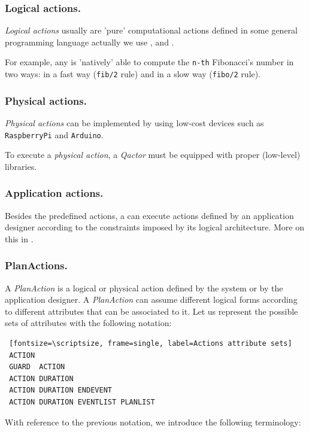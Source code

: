 \subsubsection{Logical actions.}
\textit{Logical actions} usually are 'pure' computational actions defined in some general programming language  actually we use \java, \prolog{} and \javascript{}.

For example, any \qa{} is 'natively' able to compute the \texttt{n-th} Fibonacci's number in two ways: in a fast way (\texttt{fib/2} \prolog{} rule) and in a slow way (\texttt{fibo/2} \prolog{} rule).


\subsubsection{Physical actions.}
\textit{Physical actions} can be implemented by using low-cost devices such as \texttt{RaspberryPi} and \texttt{Arduino}. 

To execute a \textit{physical action}, a \textit{Qactor} must be equipped with proper (low-level) libraries.


\subsubsection{Application actions. }
Besides the predefined actions, a \qa{} can execute actions defined by an application designer according to the constraints imposed by its logical architecture. More on this in .

\subsubsection{PlanActions.}

A \textit{PlanAction} is a logical or physical action defined by the system or by the application designer. 
A \textit{PlanAction} can assume different logical forms according to different attributes that can be associated to it. Let us represent the possible sets of attributes with the following notation:

\begin{Verbatim} [fontsize=\scriptsize, frame=single, label=Actions attribute sets]
 ACTION 
 GUARD  ACTION
 ACTION DURATION
 ACTION DURATION ENDEVENT
 ACTION DURATION EVENTLIST PLANLIST
\end{Verbatim}

\noindent{}With reference to the previous notation, we introduce the following terminology:

